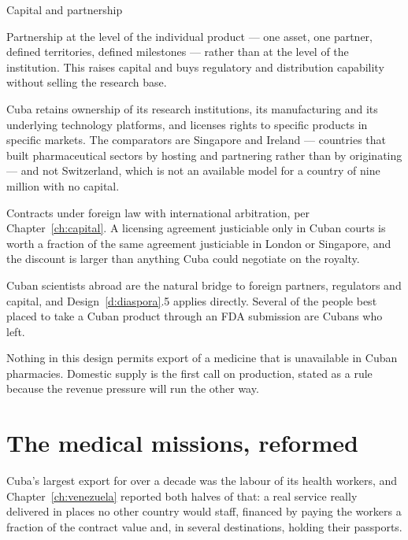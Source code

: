 \begin{design}{Capital and partnership}
\label{d:biopartner}
\begin{rules}
 Partnership at the level of the individual
product --- one asset, one partner, defined territories, defined milestones ---
rather than at the level of the institution. This raises capital and buys
regulatory and distribution capability without selling the research base.

 Cuba retains ownership of its
research institutions, its manufacturing and its underlying technology
platforms, and licenses rights to specific products in specific markets. The
comparators are Singapore and Ireland --- countries that built pharmaceutical
sectors by hosting and partnering rather than by originating --- and not
Switzerland, which is not an available model for a country of nine million with
no capital.

 Contracts under foreign law with international
arbitration, per Chapter~\ref{ch:capital}. A licensing agreement justiciable
only in Cuban courts is worth a fraction of the same agreement justiciable in
London or Singapore, and the discount is larger than anything Cuba could
negotiate on the royalty.

 Cuban scientists abroad are the natural bridge to
foreign partners, regulators and capital, and Design~\ref{d:diaspora}.5 applies
directly. Several of the people best placed to take a Cuban product through an
FDA submission are Cubans who left.

 Nothing in this design permits export of a
medicine that is unavailable in Cuban pharmacies. Domestic supply is the first
call on production, stated as a rule because the revenue pressure will run the
other way.
\end{rules}
\end{design}

\section{The medical missions, reformed}

Cuba's largest export for over a decade was the labour of its health workers, and
Chapter~\ref{ch:venezuela} reported both halves of that: a real service really
delivered in places no other country would staff, financed by paying the workers
a fraction of the contract value and, in several destinations, holding their
passports.


